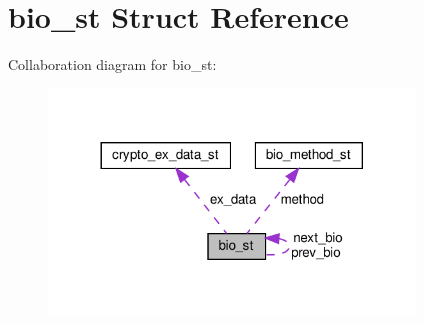 \hypertarget{structbio__st}{}\section{bio\+\_\+st Struct Reference}
\label{structbio__st}


Collaboration diagram for bio\+\_\+st\+:
\nopagebreak
\begin{figure}[H]
\begin{center}
\leavevmode
\includegraphics[width=276pt]{structbio__st__coll__graph}
\end{center}
\end{figure}
